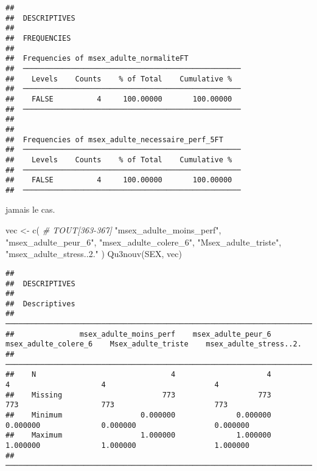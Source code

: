 \documentclass[
]{article}
\newenvironment{Shaded}{\begin{snugshade}}{\end{snugshade}}
\newcommand{\CommentTok}[1]{\textcolor[rgb]{0.56,0.35,0.01}{\textit{#1}}}
\newcommand{\FunctionTok}[1]{\textcolor[rgb]{0.00,0.00,0.00}{#1}}
\newcommand{\NormalTok}[1]{#1}
\newcommand{\OtherTok}[1]{\textcolor[rgb]{0.56,0.35,0.01}{#1}}
\newcommand{\StringTok}[1]{\textcolor[rgb]{0.31,0.60,0.02}{#1}}
\begin{document}
\begin{verbatim}
## 
##  DESCRIPTIVES
## 
##  FREQUENCIES
## 
##  Frequencies of msex_adulte_normaliteFT             
##  ────────────────────────────────────────────────── 
##    Levels    Counts    % of Total    Cumulative %   
##  ────────────────────────────────────────────────── 
##    FALSE          4     100.00000       100.00000   
##  ────────────────────────────────────────────────── 
## 
## 
##  Frequencies of msex_adulte_necessaire_perf_5FT     
##  ────────────────────────────────────────────────── 
##    Levels    Counts    % of Total    Cumulative %   
##  ────────────────────────────────────────────────── 
##    FALSE          4     100.00000       100.00000   
##  ──────────────────────────────────────────────────
\end{verbatim}

jamais le cas.

\begin{Shaded}
\begin{Highlighting}[]
\NormalTok{vec }\OtherTok{\textless{}{-}} \FunctionTok{c}\NormalTok{(  }\CommentTok{\# TOUT[363{-}367]}
  \StringTok{"msex\_adulte\_moins\_perf"}\NormalTok{, }\StringTok{"msex\_adulte\_peur\_6"}\NormalTok{,                                  }
  \StringTok{"msex\_adulte\_colere\_6"}\NormalTok{, }\StringTok{"Msex\_adulte\_triste"}\NormalTok{,                                  }
  \StringTok{"msex\_adulte\_stress..2."}     
\NormalTok{  )}
\FunctionTok{Qu3nouv}\NormalTok{(SEX, vec)}
\end{Highlighting}
\end{Shaded}

\begin{verbatim}
## 
##  DESCRIPTIVES
## 
##  Descriptives                                                                                                                        
##  ─────────────────────────────────────────────────────────────────────────────────────────────────────────────────────────────────── 
##               msex_adulte_moins_perf    msex_adulte_peur_6    msex_adulte_colere_6    Msex_adulte_triste    msex_adulte_stress..2.   
##  ─────────────────────────────────────────────────────────────────────────────────────────────────────────────────────────────────── 
##    N                               4                     4                       4                     4                         4   
##    Missing                       773                   773                     773                   773                       773   
##    Minimum                  0.000000              0.000000                0.000000              0.000000                  0.000000   
##    Maximum                  1.000000              1.000000                1.000000              1.000000                  1.000000   
##  ───────────────────────────────────────────────────────────────────────────────────────────────────────────────────────────────────
\end{verbatim}
\end{document}
